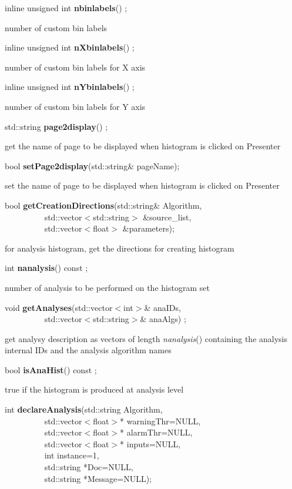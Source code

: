 \item    inline unsigned int {\bf nbinlabels}() ;

 number of custom bin labels


\item    inline unsigned int {\bf nXbinlabels}() ;

 number of custom bin labels for X axis


\item    inline unsigned int {\bf nYbinlabels}() ;

 number of custom bin labels for Y axis


\item    std::string {\bf page2display}() ;

 get the name of page to be displayed when histogram is clicked on Presenter


\item    bool {\bf setPage2display}(std::string\& pageName);


 set the name of page to be displayed when histogram is clicked on Presenter


\item    bool {\bf getCreationDirections}(std::string\& Algorithm,\\\mbox{}~~~~~~~~~
			     std::vector$<$std::string$>$ \&source\_list,\\\mbox{}~~~~~~~~~
			     std::vector$<$float$>$ \&parameters);

 for analysis histogram, get the directions for creating histogram


\item    int {\bf nanalysis}() const ;

 number of analysis to be performed on the histogram set


\item    void {\bf getAnalyses}(std::vector$<$int$>$\& anaIDs,\\\mbox{}~~~~~~~~~
		   std::vector$<$std::string$>$\& anaAlgs) ;

 get analysy description as vectors of length {\it  nanalysis}() containing 
 the analysis internal IDs and the analysis algorithm names


\item    bool {\bf isAnaHist}() const ;

 true if the histogram is produced at analysis level


\item    int {\bf declareAnalysis}(std::string Algorithm,\\\mbox{}~~~~~~~~~ 
                      std::vector$<$float$>$* warningThr=NULL,\\\mbox{}~~~~~~~~~ 
                      std::vector$<$float$>$* alarmThr=NULL,\\\mbox{}~~~~~~~~~ 
                      std::vector$<$float$>$* inputs=NULL,\\\mbox{}~~~~~~~~~ 
                      int instance=1,\\\mbox{}~~~~~~~~~
                      std::string *Doc=NULL,\\\mbox{}~~~~~~~~~
                      std::string *Message=NULL);

